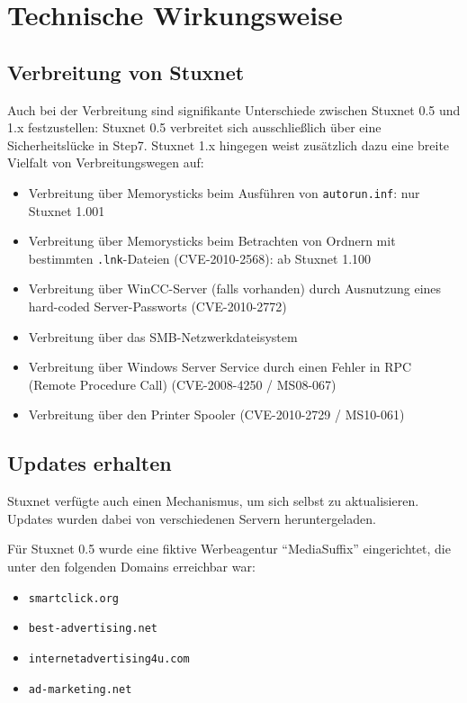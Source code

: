 \documentclass[a4paper]{article}
\begin{document}
\section{Technische Wirkungsweise}

\subsection{Verbreitung von Stuxnet}

Auch bei der Verbreitung sind signifikante Unterschiede zwischen Stuxnet 0.5 und 1.x festzustellen:
Stuxnet 0.5 verbreitet sich ausschließlich über eine Sicherheitslücke in Step7.
Stuxnet 1.x hingegen weist zusätzlich dazu eine breite Vielfalt von Verbreitungswegen auf:

\begin{itemize}
\item Verbreitung über Memorysticks beim Ausführen von \texttt{autorun.inf}: nur Stuxnet 1.001\cite{dossier} %
\item Verbreitung über Memorysticks beim Betrachten von Ordnern mit bestimmten \texttt{.lnk}-Dateien (CVE-2010-2568\cite{CVE_lnk}): ab Stuxnet 1.100
\item Verbreitung über WinCC-Server (falls vorhanden) durch Ausnutzung eines hard-coded Server-Passworts (CVE-2010-2772\cite{CVE_wincc})
\item Verbreitung über das SMB-Netzwerkdateisystem
\item Verbreitung über Windows Server Service durch einen Fehler in RPC (Remote Procedure Call) (CVE-2008-4250\cite{CVE_rpc} / MS08-067\cite{MS_rpc})
\item Verbreitung über den Printer Spooler (CVE-2010-2729\cite{CVE_spooler} / MS10-061\cite{MS_spooler})
\end{itemize} %

\subsection{Updates erhalten}

Stuxnet verfügte auch einen Mechanismus, um sich selbst zu aktualisieren.
Updates wurden dabei von verschiedenen Servern heruntergeladen.

Für Stuxnet 0.5 wurde eine fiktive Werbeagentur ``MediaSuffix'' eingerichtet, die unter den folgenden Domains erreichbar war:

\begin{itemize}
\item \texttt{smartclick.org}
\item \texttt{best-advertising.net}
\item \texttt{internetadvertising4u.com}
\item \texttt{ad-marketing.net}
\end{itemize}
\end{document}
